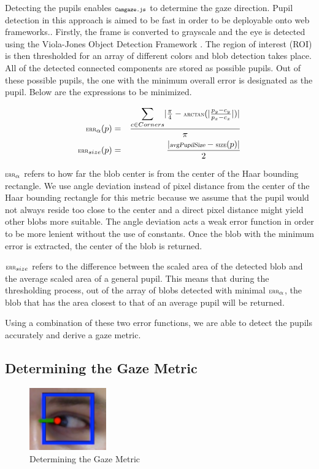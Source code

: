 \documentclass[annual]{acmsiggraph}
\newcommand{\Acronym}[1]{\ensuremath{{\small{\texttt{#1}}}}}
\newcommand{\Name}{\Acronym{Camgaze.js}} \newcommand{\False}{\Constant{false}}
\newcommand{\Function}[1]{\ensuremath{{\small \textsc{#1}}}}
\newcommand{\Constant}[1]{\ensuremath{\small{\texttt{#1}}}}
\newcommand{\Var}[1]{\ensuremath{{\small{\textsl{#1}}}}}
\begin{document}
Detecting the pupils enables $\Name$ to determine the gaze direction.
Pupil detection in this approach is aimed to be fast in order to be deployable
onto web frameworks.. Firstly, the frame is converted to grayscale and the eye
is detected using the Viola-Jones Object Detection Framework \cite{Viola01}.
The region of interest (ROI) is then thresholded for an array of different
colors and blob detection takes place. All of the detected connected components
are stored as possible pupils. Out of these possible pupils, the one with the
minimum overall error is designated as the pupil.  Below are the expressions to
be minimized.

\begin{eqnarray}
\Function{err}_{\alpha}(p) &=& \frac{
    \mathlarger{\sum}_{c \in Corners}{
        \vert
            \frac{\pi}{4} - \Function{arctan}(
                \vert \frac{p_y - c_y}{p_x - c_x} \vert
            )
        \vert
    } }{\pi} \\ \Function{err}_{size}(p) &=& \frac{ \vert \Var{avgPupilSize} -
    \Function{size}(p) \vert }{2} \end{eqnarray}

$\Function{err}_{\alpha}$ refers to how far the blob center is from the
center of the Haar bounding rectangle. We use angle deviation instead of pixel
distance from the center of the Haar bounding rectangle for this metric because
we assume that the pupil would not always reside too close to the center and a
direct pixel distance might yield other blobs more suitable. The angle
deviation acts a weak error function in order to be more lenient without the
use of constants.  Once the blob with the minimum error is extracted, the
center of the blob is returned.

$\Function{err}_{size}$ refers to the difference between the scaled area of the
detected blob and the average scaled area of a general pupil. This means that
during the thresholding process, out of the  array of blobs detected with
minimal $\Function{err}_{\alpha}$, the blob that has the area closest to that
of an average pupil will be returned.

Using a combination of these two error functions, we are able to detect the
pupils accurately and derive a gaze metric.

\subsection{Determining the Gaze Metric}

\begin{figure}[ht]

    \centering

    \includegraphics[width=1.3in]{figs/gazePrediction.pdf}

    \caption{Determining the Gaze Metric}

\end{figure}
\end{document}
